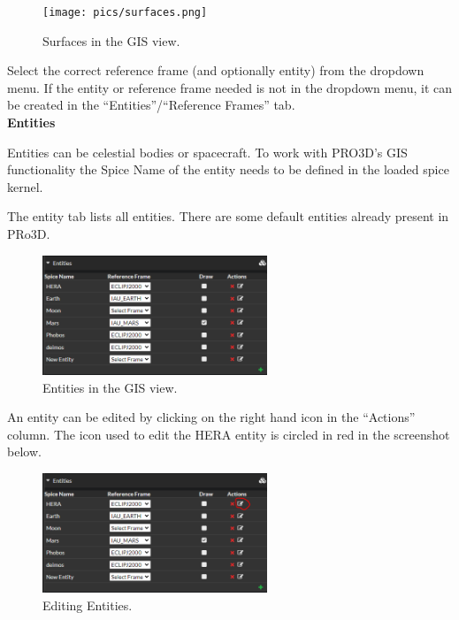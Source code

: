 \begin{figure}[h!]
	\centering
\texttt{[image: pics/surfaces.png]}
	\caption{Surfaces in the GIS view.}
\end{figure}


Select the correct reference frame (and optionally entity) from the
dropdown menu. If the entity or reference frame needed is not in the
dropdown menu, it can be created in the ``Entities''/``Reference
Frames'' tab.
\\

\hypertarget{entities}{%
	\textbf{Entities}\label{entities}}

Entities can be celestial bodies or spacecraft. To work with PRO3D's GIS
functionality the Spice Name of the entity needs to be defined in the
loaded spice kernel.

The entity tab lists all entities. There are some default entities
already present in PRo3D.

\begin{figure}[h!]
	\centering
	\includegraphics[width=0.6\textwidth]{pics/entities.png}
	\caption{Entities in the GIS view.}
\end{figure}



An entity can be edited by clicking on the right hand icon in the
``Actions'' column. The icon used to edit the HERA entity is circled in
red in the screenshot below.

\begin{figure}[h!]
	\centering
	\includegraphics[width=0.6\textwidth]{pics/editEntities.png}
	\caption{Editing Entities.}
\end{figure}

